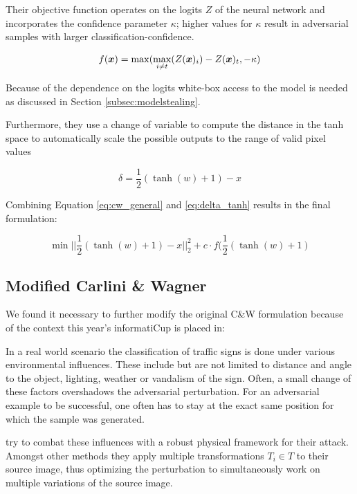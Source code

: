Their objective function operates on the logits $Z$ of the neural network and incorporates the confidence parameter $\kappa$; higher values for $\kappa$ result in adversarial samples with larger classification-confidence.

\begin{equation*}
f(\boldsymbol{x}) = \max(\underset{i\neq t}{\max}(Z(\boldsymbol{x})_i) - Z(\boldsymbol{x})_t, -\kappa)
\end{equation*}

Because of the dependence on the logits white-box access to the model is needed as discussed in Section \ref{subsec:modelstealing}.

Furthermore, they use a change of variable to compute the distance in the tanh space to automatically scale the possible outputs to the range of valid pixel values

\begin{equation}\label{eq:delta_tanh}
\delta = \frac{1}{2}(\tanh(w)+1) - x
\end{equation}

Combining Equation \ref{eq:cw_general} and \ref{eq:delta_tanh} results in the final formulation:

\begin{equation}\label{eq:cwl2_min_final}
\min ||\frac{1}{2}(\tanh(w)+1)-x||^2_2 + c \cdot f(\frac{1}{2}(\tanh(w)+1)
\end{equation}

\subsection{Modified Carlini \& Wagner}\label{subsec:cwl2_mod}

We found it necessary to further modify the original C\&W formulation because of the context this year's informatiCup is placed in:

In a real world scenario the classification of traffic signs is done under various environmental influences.
These include but are not limited to distance and angle to the object, lighting, weather or vandalism of the sign.
Often, a small change of these factors overshadows the adversarial perturbation. %
For an adversarial example to be successful, one often has to stay at the exact same position for which the sample was generated. 

\citet{eykholt2018robust} try to combat these influences with a robust physical framework for their attack.
Amongst other methods they apply multiple transformations $T_i \in T$ to their source image,
thus optimizing the perturbation to simultaneously work on multiple variations of the source image.

